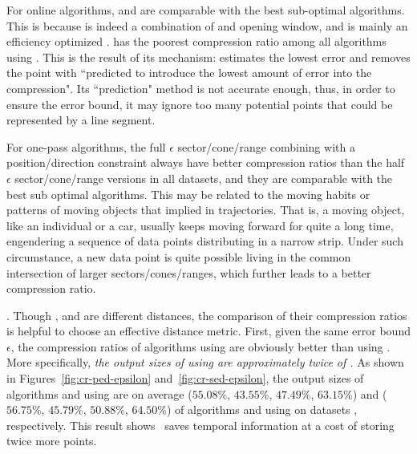 For online algorithms, \bqsa and \opwa are comparable with the best sub-optimal algorithms. This is because \opwa is indeed a combination of \dpa and opening window, and \bqsa is mainly an efficiency optimized \opwa.
\squishe has the poorest compression ratio among all algorithms using \sed. This is the result of its mechanism: \squishe estimates the lowest \sed error and removes the point with ``predicted to introduce the lowest amount of error into the compression"\cite{Muckell:SQUISH}. Its ``prediction" method is not accurate enough, thus, in order to ensure the error bound, it may ignore too many potential points that could be represented by a line segment.

For one-pass algorithms, the full $\epsilon$ sector/cone/range combining with a position/direction constraint always have better compression ratios than the half $\epsilon$ sector/cone/range versions in all datasets, and they are comparable with the best sub optimal algorithms.
This may be related to the moving habits or patterns of moving objects that implied in trajectories.
That is, a moving object, like an individual or a car, usually keeps moving forward for quite a long time, engendering a sequence of data points distributing in a narrow strip. Under such circumstance, a new data point is quite possible living in the common intersection of larger sectors/cones/ranges, which further leads to a better compression ratio.




.
Though \ped, \sed and \dad are different distances, the comparison of their compression ratios is helpful to choose an effective distance metric.
%
First, given the same error bound $\epsilon$, the compression ratios of algorithms using \ped are obviously better
than using \sed. More specifically, \emph{the output sizes of using \sed are approximately twice of \ped.}
%
As shown in Figures~\ref{fig:cr-ped-epsilon} and~\ref{fig:cr-sed-epsilon}, the output sizes of algorithms \tpa and \dpa
using \ped are on average ($55.08\%$, $43.55\%$, $47.49\%$, $63.15\%$) and ($56.75\%$, $45.79\%$,
$50.88\%$, $64.50\%$) of algorithms \tpa and \dpa using \sed on datasets \dSets, respectively.
%
%
This result shows ~\sed saves temporal information at a cost of storing twice more points.


